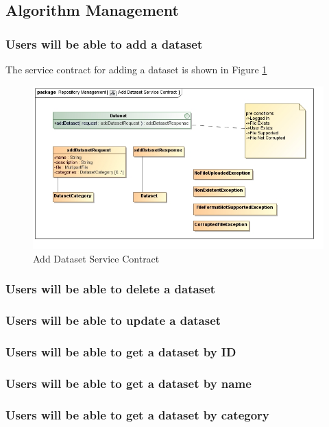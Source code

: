 \subsection{Algorithm Management}

\subsubsection {Users will be able to add a dataset}
The service contract for adding a dataset is shown in Figure \ref{fig:addDatasetService}
\begin{figure}[H]
  \begin{center}
  \includegraphics[scale=0.6]{../Diagrams and Charts/Test Data/Add Dataset Service Contract.jpg}
  \caption{Add Dataset Service Contract}
  \end{center}
  \label{fig:addDatasetService}
\end{figure}

\subsubsection {Users will be able to delete a dataset}
\subsubsection {Users will be able to update a dataset}
\subsubsection {Users will be able to get a dataset by ID}
\subsubsection {Users will be able to get a dataset by name}
\subsubsection {Users will be able to get a dataset by category}
